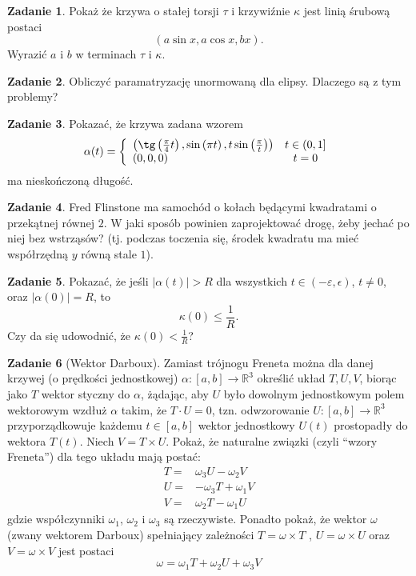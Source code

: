 \documentclass[a4paper,11pt]{article}
\theoremstyle{definition}\newtheorem{exercise}{Zadanie}
\theoremstyle{definition}\newtheorem{remark}{Uwaga}
\begin{document}
\begin{exercise} 
Pokaż że krzywa o stałej torsji $\tau$ i krzywiźnie $\kappa$ jest linią śrubową 
postaci
\[(a \sin{x},a\cos{x},b x).\]
Wyrazić $a$ i $b$ w terminach $\tau$ i $\kappa$.
\end{exercise}

\begin{exercise}
Obliczyć paramatryzację unormowaną dla elipsy. Dlaczego są z tym problemy?
\end{exercise}

\begin{exercise}
Pokazać, że krzywa zadana wzorem
\[\alpha(t)=\left\{
\begin{array}{lc}
\left(\tg\left(\frac{\pi}{4}t\right),\sin\left(\pi t\right),t 
\sin\left(\frac{\pi} {t}\right)\right) & t\in (0,1]\\
(0,0,0) & t=0
\end{array}\right.\]
ma nieskończoną długość.

\end{exercise}

\begin{exercise}
Fred Flinstone ma samochód o kołach będącymi kwadratami o przekątnej równej $2$. W jaki sposób powinien zaprojektować drogę, żeby jechać po niej bez wstrząsów? (tj. podczas toczenia się, środek kwadratu ma mieć współrzędną $y$ równą stale $1$).
\end{exercise}

\begin{exercise}
Pokazać, że jeśli $|\alpha(t)|>R$ dla wszystkich $t\in (-\varepsilon, 
\epsilon)$, $t\neq 0$, oraz $|\alpha(0)|=R$, to 
\[\kappa(0)\leqslant \frac{1}{R}.\]
Czy da się udowodnić, że $\kappa(0)<\frac{1}{R}$?
\end{exercise}

\begin{exercise}[Wektor Darboux]
Zamiast trójnogu Freneta można dla danej krzywej (o prędkości jednostkowej) $\alpha\colon[a,b]\to \mathbb{R}^3$ określić układ ${T, U, V }$, biorąc jako $T$ wektor styczny do $\alpha$, żądając, aby $U$ było dowolnym jednostkowym polem wektorowym wzdłuż $\alpha$ takim, że $T\cdot U= 0$, tzn. odwzorowanie $U\colon[a, b] \to \mathbb{R}^3$ przyporządkowuje każdemu $t \in [a, b]$ wektor jednostkowy $U(t)$ prostopadły do wektora $T(t)$. Niech $V = T \times U$. Pokaż, że naturalne związki (czyli ``wzory Freneta'') dla tego układu mają postać:
\begin{align*}
T =& \omega_3 U - \omega_2V \\
U =& -\omega_3T + \omega_1 V\\
V =& \omega_2 T - \omega_1U
\end{align*}
gdzie współczynniki $\omega_1$, $\omega_2$ i $\omega_3$ są rzeczywiste. Ponadto 
pokaż, że wektor $\omega$ (zwany wektorem Darboux) spełniający zależności $T = 
\omega\times T$ , $U = \omega\times  U$ oraz $V = \omega\times  V$
jest postaci \[\omega = \omega_1T + \omega_2U + \omega_3 V \]
\end{exercise}
\end{document}
